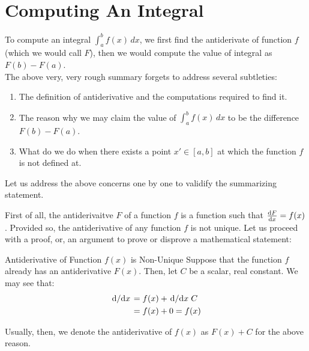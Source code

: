 \section{Computing An Integral}
To compute an integral $\int_a^b f(x) \,dx$, we first find the antiderivate of function $f$ (which we would call $F$), then we would compute the value of integral as $F(b) - F(a)$. \\
The above very, very rough summary forgets to address several subtleties:
\begin{enumerate}
    \item The definition of antiderivative and the computations required to find it.
    \item The reason why we may claim the value of $\int_a^b f(x) \,dx$ to be the difference $F(b) - F(a)$.
    \item What do we do when there exists a point $x' \in [a, b]$ at which the function $f$ is not defined at.
\end{enumerate}

Let us address the above concerns one by one to validify the summarizing statement.

First of all, the antiderivaitve $F$ of a function $f$ is a function such that $\dv{F}{x} = f(x)$.
Provided so, the antiderivative of any function $f$ is not unique. Let us proceed with a proof, or, an argument to prove or disprove a mathematical statement:
\begin{ln-explain}{Antiderivative of Function $f(x)$ is Non-Unique}{}
    Suppose that the function $f$ already has an antiderivative $F(x)$.
    Then, let $C$ be a scalar, real constant. We may see that:
    \begin{align*}
        \dv*{}{x} (F(x) + C) &= f(x) + \dv*{}{x} C \\
        &= f(x) + 0 = f(x)
    \end{align*}
\end{ln-explain}
Usually, then, we denote the antiderivative of $f(x)$ as $F(x) + C$ for the above reason.

